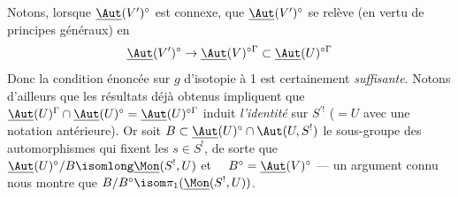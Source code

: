 Notons, lorsque $\underline{\Aut} (V')^\circ$ est connexe, que $\underline{\Aut} (V')^\circ$ se relève (en vertu de principes généraux) en 
$$
\underline{\Aut} (V')^\circ \to \underline{\Aut} (V)^{\circ \Gamma} \subset  \underline{\Aut} (U)^{\circ \Gamma} 
$$
Donc la condition énoncée sur $g$ d'isotopie à 1 est certainement \emph{suffisante}. Notons d'ailleurs que les résultats déjà obtenus impliquent que $\underline{\Aut} (U)^\Gamma \cap \underline{\Aut} (U)^\circ = \underline{\Aut} (U)^{\circ \Gamma}$ induit \emph{l'identité} sur $S^{'!}$ ($= U$ avec une notation antérieure). Or soit $B \subset  \underline{\Aut} (U)^\circ \cap \Aut (U, S^!)$ le sous-groupe des automorphismes qui fixent les $s \in S^!$, de sorte que $\underline{\Aut} (U)^\circ / B \isomlong \underline{\Mon} (S^!, U)$ et $\quad B^\circ = \underline{\Aut} (V)^\circ$ --- un argument connu nous montre que $B/B^\circ \isom \pi_1 (\underline{\Mon}(S^!, U))$.

